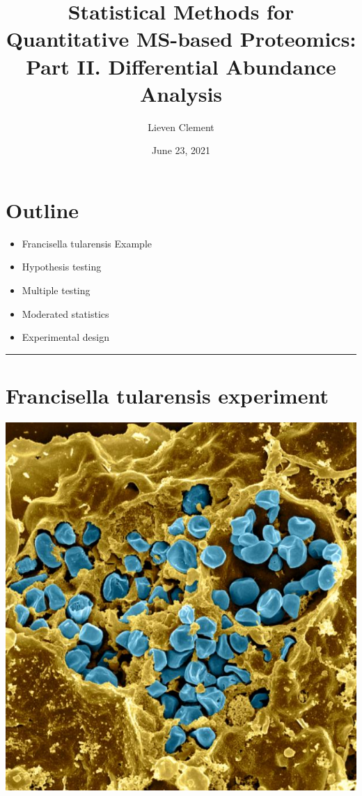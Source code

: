 \documentclass[
]{article}
\title{Statistical Methods for Quantitative MS-based Proteomics: Part
II. Differential Abundance Analysis}
\author{Lieven Clement}
\date{June 23, 2021}
\providecommand{\tightlist}{%
  \setlength{\itemsep}{0pt}\setlength{\parskip}{0pt}}
\begin{document}
\maketitle

{
\setcounter{tocdepth}{2}
\tableofcontents
}
\hypertarget{outline}{%
\section*{Outline}\label{outline}}

\begin{itemize}
\tightlist
\item
  Francisella tularensis Example
\item
  Hypothesis testing
\item
  Multiple testing
\item
  Moderated statistics
\item
  Experimental design
\end{itemize}

\begin{center}\rule{0.5\linewidth}{0.5pt}\end{center}

\hypertarget{francisella-tularensis-experiment}{%
\section{Francisella tularensis
experiment}\label{francisella-tularensis-experiment}}

\includegraphics{./figures/francisella.jpg}
\end{document}
